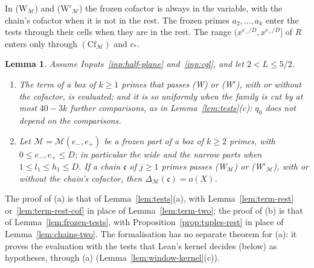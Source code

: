 \documentclass[11pt]{article}
\newtheorem{lemma}[theorem]{Lemma}
\theoremstyle{definition}
\begin{document}
In (W$_{\mathcal M}$) and (W$'_{\mathcal M}$) the frozen cofactor is always in the variable, with the chain's cofactor
when it is not in the rest. The frozen primes $a_2, \dots, a_k$ enter the tests through their cells when they are in
the rest. The range $(x^{e_-/D}, x^{e_+/D}]$ of $R$ enters only through $(\mathrm{Cf}_{\mathcal M})$ and $c_*$.

\begin{lemma}\label{lem:window-tests}
Assume Inputs~\ref{inp:half-plane} and~\ref{inp:cgl}, and let $2 < L \le 5/2$.
\begin{enumerate}
\item[(a)] The term of a box of $k \ge 1$ primes that passes (W) or (W$'$), with or without the cofactor, is
  evaluated; and it is so uniformly when the family is cut by at most $40 - 3k$ further comparisons, as in
  Lemma~\ref{lem:tests}(c): $q_0$ does not depend on the comparisons.
\item[(b)] Let $\mathcal M = \mathcal M(e_-, e_+)$ be a frozen part of a box of $k \ge 2$ primes, with $0 \le e_-, e_+
  \le D$; in particular the wide and the narrow parts when $1 \le l_1 \le h_1 \le D$. If a chain $\mathfrak c$ of $j \ge
  1$ primes passes
  (W$_{\mathcal M}$) or (W$'_{\mathcal M}$), with or without the chain's cofactor, then $\Delta_{\mathcal M}(\mathfrak
  c) = o(X)$.
\end{enumerate}
\end{lemma}

The proof of (a) is that of Lemma~\ref{lem:tests}(a), with Lemma~\ref{lem:term-rest} or~\ref{lem:term-rest-cof} in
place of Lemma~\ref{lem:term-two}; the proof of (b) is that of Lemma~\ref{lem:frozen-tests}, with
Proposition~\ref{prop:tuples-rest} in place of Lemma~\ref{lem:chains-two}. The formalisation has no separate theorem
for (a): it proves the evaluation with the tests that Lean's kernel decides (below) as hypotheses, through (a)
(Lemma~\ref{lem:window-kernel}(c)).
\end{document}
